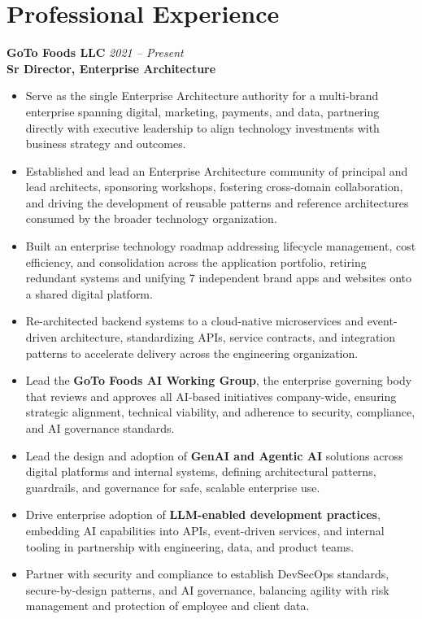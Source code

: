 \documentclass[11pt]{article}
\begin{document}
\section*{Professional Experience}

\textbf{GoTo Foods LLC} \hfill \textit{2021 -- Present} \\
\textbf{Sr Director, Enterprise Architecture}

\begin{itemize}
  \item Serve as the single Enterprise Architecture authority for a multi-brand enterprise spanning digital, marketing, payments, and data, partnering directly with executive leadership to align technology investments with business strategy and outcomes.
  \item Established and lead an Enterprise Architecture community of principal and lead architects, sponsoring workshops, fostering cross-domain collaboration, and driving the development of reusable patterns and reference architectures consumed by the broader technology organization.
  \item Built an enterprise technology roadmap addressing lifecycle management, cost efficiency, and consolidation across the application portfolio, retiring redundant systems and unifying 7 independent brand apps and websites onto a shared digital platform.
  \item Re-architected backend systems to a cloud-native microservices and event-driven architecture, standardizing APIs, service contracts, and integration patterns to accelerate delivery across the engineering organization.
  \item Lead the \textbf{GoTo Foods AI Working Group}, the enterprise governing body that reviews and approves all AI-based initiatives company-wide, ensuring strategic alignment, technical viability, and adherence to security, compliance, and AI governance standards.
  \item Lead the design and adoption of \textbf{GenAI and Agentic AI} solutions across digital platforms and internal systems, defining architectural patterns, guardrails, and governance for safe, scalable enterprise use.
  \item Drive enterprise adoption of \textbf{LLM-enabled development practices}, embedding AI capabilities into APIs, event-driven services, and internal tooling in partnership with engineering, data, and product teams.
  \item Partner with security and compliance to establish DevSecOps standards, secure-by-design patterns, and AI governance, balancing agility with risk management and protection of employee and client data.

\end{itemize}
\end{document}
